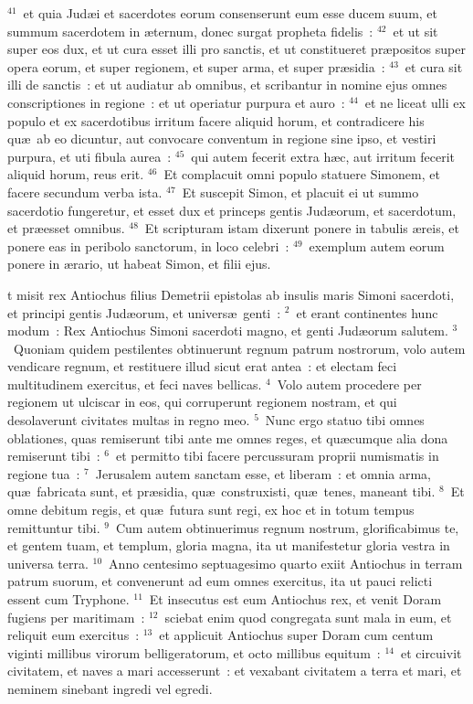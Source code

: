 ${}^{41}$~et quia Jud\ae i et sacerdotes eorum consenserunt eum esse ducem suum, et summum sacerdotem in \ae ternum, donec surgat propheta fidelis~:
${}^{42}$~et ut sit super eos dux, et ut cura esset illi pro sanctis, et ut constitueret pr\ae positos super opera eorum, et super regionem, et super arma, et super pr\ae sidia~:
${}^{43}$~et cura sit illi de sanctis~: et ut audiatur ab omnibus, et scribantur in nomine ejus omnes conscriptiones in regione~: et ut operiatur purpura et auro~:
${}^{44}$~et ne liceat ulli ex populo et ex sacerdotibus irritum facere aliquid horum, et contradicere his qu\ae\ ab eo dicuntur, aut convocare conventum in regione sine ipso, et vestiri purpura, et uti fibula aurea~:
${}^{45}$~qui autem fecerit extra h\ae c, aut irritum fecerit aliquid horum, reus erit.
${}^{46}$~Et complacuit omni populo statuere Simonem, et facere secundum verba ista.
${}^{47}$~Et suscepit Simon, et placuit ei ut summo sacerdotio fungeretur, et esset dux et princeps gentis Jud\ae orum, et sacerdotum, et pr\ae esset omnibus.
${}^{48}$~Et scripturam istam dixerunt ponere in tabulis \ae reis, et ponere eas in peribolo sanctorum, in loco celebri~:
${}^{49}$~exemplum autem eorum ponere in \ae rario, ut habeat Simon, et filii ejus.

\bchapter
{}t misit rex Antiochus filius Demetrii epistolas ab insulis maris Simoni sacerdoti, et principi gentis Jud\ae orum, et univers\ae\ genti~:
${}^{2}$~et erant continentes hunc modum~: Rex Antiochus Simoni sacerdoti magno, et genti Jud\ae orum salutem.
${}^{3}$~Quoniam quidem pestilentes obtinuerunt regnum patrum nostrorum, volo autem vendicare regnum, et restituere illud sicut erat antea~: et electam feci multitudinem exercitus, et feci naves bellicas.
${}^{4}$~Volo autem procedere per regionem ut ulciscar in eos, qui corruperunt regionem nostram, et qui desolaverunt civitates multas in regno meo.
${}^{5}$~Nunc ergo statuo tibi omnes oblationes, quas remiserunt tibi ante me omnes reges, et qu\ae cumque alia dona remiserunt tibi~:
${}^{6}$~et permitto tibi facere percussuram proprii numismatis in regione tua~:
${}^{7}$~Jerusalem autem sanctam esse, et liberam~: et omnia arma, qu\ae\ fabricata sunt, et pr\ae sidia, qu\ae\ construxisti, qu\ae\ tenes, maneant tibi.
${}^{8}$~Et omne debitum regis, et qu\ae\ futura sunt regi, ex hoc et in totum tempus remittuntur tibi.
${}^{9}$~Cum autem obtinuerimus regnum nostrum, glorificabimus te, et gentem tuam, et templum, gloria magna, ita ut manifestetur gloria vestra in universa terra.
${}^{10}$~Anno centesimo septuagesimo quarto exiit Antiochus in terram patrum suorum, et convenerunt ad eum omnes exercitus, ita ut pauci relicti essent cum Tryphone.
${}^{11}$~Et insecutus est eum Antiochus rex, et venit Doram fugiens per maritimam~:
${}^{12}$~sciebat enim quod congregata sunt mala in eum, et reliquit eum exercitus~:
${}^{13}$~et applicuit Antiochus super Doram cum centum viginti millibus virorum belligeratorum, et octo millibus equitum~:
${}^{14}$~et circuivit civitatem, et naves a mari accesserunt~: et vexabant civitatem a terra et mari, et neminem sinebant ingredi vel egredi.


